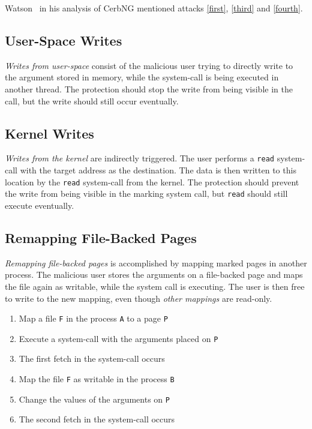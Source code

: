 Watson~\cite{watson2007exploiting} in his analysis of CerbNG mentioned attacks
\autoref{first}, \autoref{third} and \autoref{fourth}.

\subsection{User-Space Writes}

\emph{Writes from user-space} consist of the malicious user trying to directly
write to the argument stored in memory, while the system-call is being executed
in another thread. The protection should stop the write from being visible in
the call, but the write should still occur eventually.

\subsection{Kernel Writes}

\emph{Writes from the kernel} are indirectly triggered. The user performs a
\texttt{read} system-call with the target address as the destination. The data
is then written to this location by the \texttt{read} system-call from the
kernel. The protection should prevent the write from being visible in the
marking system call, but \texttt{read} should still execute eventually.

\subsection{Remapping File-Backed Pages}

\emph{Remapping file-backed pages} is accomplished by mapping marked pages in
another process. The malicious user stores the arguments on a file-backed page
and maps the file again as writable, while the system call is executing. The
user is then free to write to the new mapping, even though \emph{other mappings}
are read-only.

\begin{enumerate}
  \item Map a file \texttt{F} in the process \texttt{A} to a page \texttt{P}
  \item Execute a system-call with the arguments placed on \texttt{P}
  \item The first fetch in the system-call occurs
  \item Map the file \texttt{F} as writable in the process \texttt{B}
  \item Change the values of the arguments on \texttt{P}
  \item The second fetch in the system-call occurs
\end{enumerate}

